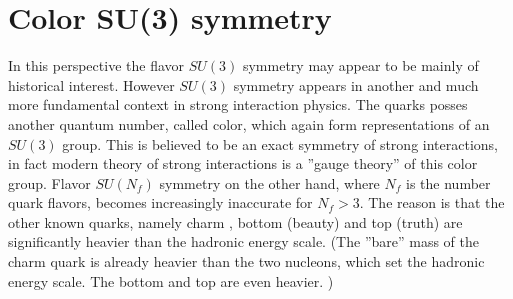 \documentclass[main.tex]{subfiles}
\begin{document}
\section{Color SU(3) symmetry}
In this perspective the flavor $SU(3)$ symmetry may appear to be mainly of historical interest. However $SU(3)$ symmetry appears in another and much more fundamental context in strong interaction physics. The quarks posses another quantum number, called color, which again form representations of an $SU(3)$ group. This is believed to be an exact symmetry of strong interactions, in fact modern theory of strong interactions is a ''gauge theory'' of this color group. Flavor $SU(N_f)$ symmetry on the other hand, where $N_f$ is the number quark flavors, becomes increasingly inaccurate for $N_f>3$. The reason is that the other known quarks, namely charm \Pqc, bottom (beauty) \Pqb and top (truth) \Pqt are significantly heavier than the hadronic energy scale. (The ''bare'' mass of the charm quark is already heavier than the two nucleons, which set the hadronic energy scale. The bottom and top are even heavier. )
\end{document}
